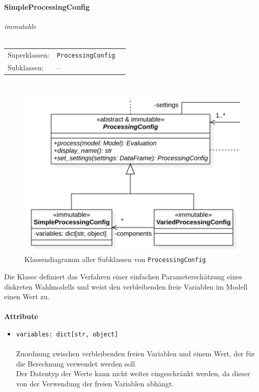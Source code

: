 \documentclass{article}
\newcommand{\classheader}[2][]{\paragraph{#2}
\mbox{}\textit{#1}\\\\}
\begin{document}
\newpage
\classheader[\flqq{}immutable\frqq]{SimpleProcessingConfig}\label{cls:SimpleProcessingConfig}
\begin{tabular}{lll}
 Superklassen: & \texttt{ProcessingConfig}\\
 Subklassen: & --
\end{tabular}\\
\begin{figure}[H]%
    \centering
    \includegraphics[width=13cm]{entwurf/Entwurf_dokument/img/cls/model/ProcessingConfigs.png}
    \caption{Klassendiagramm aller Subklassen von \texttt{ProcessingConfig}}
\end{figure}

Die Klasse definiert das Verfahren einer einfachen Parameterschätzung eines diskreten Wahlmodells und weist den verbleibenden freie Variablen im Modell einen Wert zu.
\\\\

\textbf{Attribute}
\begin{itemize}\setlength\itemsep{3em}
\item \texttt{variables: dict[str, object]}\\\\
Zuordnung zwischen verbleibenden freien Variablen und einem Wert, der für die Berechnung verwendet werden soll.\\
Der Datentyp der Werte kann nicht weiter eingeschränkt werden, da dieser von der Verwendung der freien Variablen abhängt.
\\\\
\end{itemize}
\end{document}
